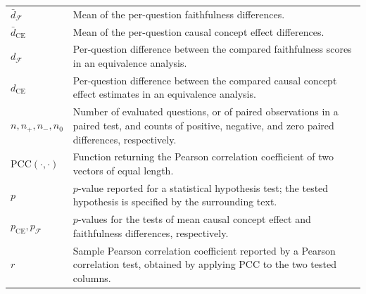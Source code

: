 \begin{longtable}{@{}>{\raggedright\arraybackslash}p{} p{}@{}}
	\hline
	$\bar{d}_{\mathcal{F}}$                            & Mean of the per-question faithfulness differences.                                                                                                                                                                 \\
	$\bar{d}_{\mathrm{CE}}$                            & Mean of the per-question causal concept effect differences.                                                                                                                                                        \\
	$d_{\mathcal{F}}$                                  & Per-question difference between the compared faithfulness scores in an equivalence analysis.                                                                                                                       \\
	$d_{\mathrm{CE}}$                                  & Per-question difference between the compared causal concept effect estimates in an equivalence analysis.                                                                                                           \\
	$n,n_{+},n_{-},n_{0}$                              & Number of evaluated questions, or of paired observations in a paired test, and counts of positive, negative, and zero paired differences, respectively.                                                            \\
	$\mathrm{PCC}(\cdot,\cdot)$                        & Function returning the Pearson correlation coefficient of two vectors of equal length.                                                                                                                             \\
	$p$                                                & $p$-value reported for a statistical hypothesis test; the tested hypothesis is specified by the surrounding text.                                                                                                  \\
	$p_{\mathrm{CE}},p_{\mathcal{F}}$                  & $p$-values for the tests of mean causal concept effect and faithfulness differences, respectively.                                                                                                                 \\
	$r$                                                & Sample Pearson correlation coefficient reported by a Pearson correlation test, obtained by applying $\mathrm{PCC}$ to the two tested columns.                                                                      \\

\end{longtable}
